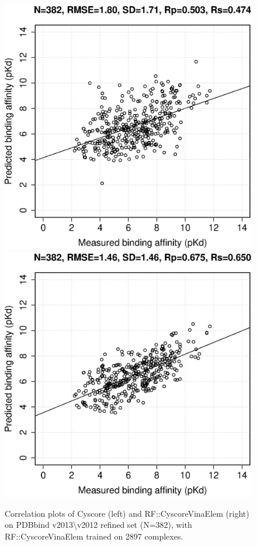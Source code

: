 \documentclass[journal=jacsat,manuscript=article]{achemso}
\begin{document}
\begin{figure}[ht!]
\includegraphics[width=\linewidth]{../rfcyscore/x4/mlr/trn-247-tst-382-yp.eps}
\endminipage
{}
\includegraphics[width=\linewidth]{../rfcyscore/x46/rf/trn-2897-tst-382-yp.eps}
\endminipage
\caption{Correlation plots of Cyscore (left) and RF::CyscoreVinaElem (right) on PDBbind v2013\textbackslash v2012 refined set (N=382), with RF::CyscoreVinaElem trained on 2897 complexes.}
\label{fig:tst382}
\end{figure}
\end{document}
